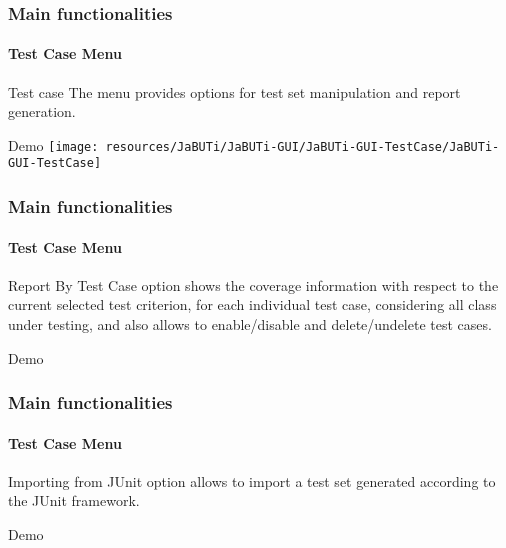 \begin{frame}[parent={cmap:jabuti-gui},hasnext=true,hasprev=true]
\frametitle{Main functionalities}
\framesubtitle{Test Case Menu}
\label{concept:test-case-menu}

\begin{block}{Test case}
The  menu provides options for test set manipulation and
report generation.
\end{block}

\begin{block}{Demo}
\texttt{[image: resources/JaBUTi/JaBUTi-GUI/JaBUTi-GUI-TestCase/JaBUTi-GUI-TestCase]}
\end{block}
\end{frame}



\begin{frame}
\frametitle{Main functionalities}
\framesubtitle{Test Case Menu}
\label{concept:report-by-test-case}

\begin{block}{Report By Test Case}
 option shows the coverage information with
respect to the current selected test criterion, for each individual test case,
considering all class under testing, and also allows to enable/disable and
delete/undelete test cases.
\end{block}

\begin{block}{Demo}
\end{block}
\end{frame}



\begin{frame}
\frametitle{Main functionalities}
\framesubtitle{Test Case Menu}
\label{concept:importing-from-junit}

\begin{block}{Importing from JUnit}
 option allows to import a test set generated
according to the JUnit framework.
\end{block}

\begin{block}{Demo}
\end{block}
\end{frame}
